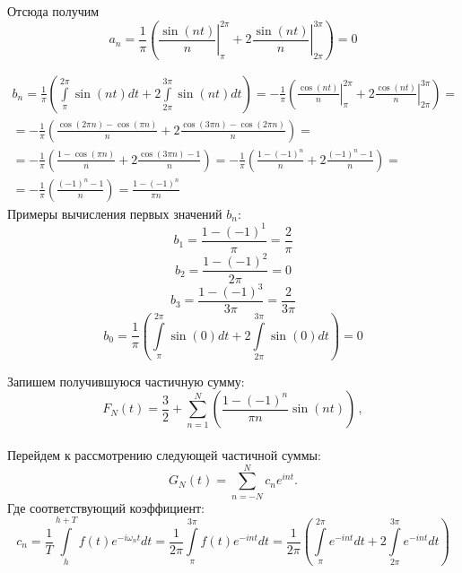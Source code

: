 \documentclass[a5paper, 10pt]{article}
\theoremstyle{definition}
\theoremstyle{plain}
\theoremstyle{remark}
\begin{document}
Отсюда получим
\begin{equation}
a_n = \frac{1}{\pi} \left( \left. \frac{\sin (nt)}{n} \right|_{\pi}^{2\pi} +  2  \left. \frac{\sin (nt)}{n} \right|_{2\pi}^{3\pi} \right) = 0
\end{equation}



\begin{multline}
b_n = \frac{1}{\pi} \left( \int \limits_{\pi}^{2\pi} \sin (n t) dt +  2\int \limits_{2\pi}^{3\pi} \sin (n t) dt \right) =
-\frac{1}{\pi} \left( \left. \frac{\cos (nt)}{n} \right|_{\pi}^{2\pi} +  2  \left. \frac{\cos (nt)}{n} \right|_{2\pi}^{3\pi} \right) =\\
= -\frac{1}{\pi} \left( \frac{\cos (2 \pi n) - \cos (\pi n)}{n} +  2 \frac{\cos (3 \pi n) - \cos (2 \pi n)}{n} \right) = \\
= -\frac{1}{\pi} \left( \frac{ 1 - \cos (\pi n)}{n} +  2 \frac{\cos (3 \pi n) - 1}{n} \right) =
-\frac{1}{\pi} \left( \frac{ 1 - (-1)^n}{n} +  2 \frac{(-1)^n - 1}{n} \right) =\\
= -\frac{1}{\pi} \left( \frac{(-1)^n - 1 }{n} \right) = \frac{1 - (-1)^n}{\pi n}
\end{multline}
Примеры вычисления первых значений $b_n$:
\begin{equation}
b_1 = \frac{1 - (-1)^1}{\pi} = \frac{2}{\pi}
\end{equation}
\begin{equation}
b_2 = \frac{1 - (-1)^2}{2\pi} = 0
\end{equation}
\begin{equation}
b_3 = \frac{1 - (-1)^3}{3\pi} = \frac{2}{3\pi}
\end{equation}
\begin{equation}
b_0 = \frac{1}{\pi} \left( \int \limits_{\pi}^{2\pi} \sin (0) dt +  2\int \limits_{2\pi}^{3\pi} \sin (0) dt \right)  = 0
\end{equation}

Запишем получившуюся частичную сумму:
\begin{equation}
F_N(t) = \frac{3}{2} + \sum  \limits_{n=1}^N \left( \frac{1 - (-1)^n}{\pi n} \sin \left( n t \right)  \right) \, ,
\end{equation}
\\
Перейдем к рассмотрению следующей частичной суммы:
\begin{equation}
G_N (t) = \sum  \limits_{n=-N}^N c_n e^{i n t}.
\end{equation}
Где соответствующий коэффициент:
\begin{equation}
c_n = \frac{1}{T} \int \limits_{h}^{h + T} f(t) e^{-i \omega_n t} dt = \frac{1}{2 \pi} \int \limits_{\pi}^{3 \pi} f(t) e^{-i n t} dt =
\frac{1}{2 \pi} \left( \int \limits_{\pi}^{2 \pi} e^{-i n t} dt + 2 \int \limits_{ 2 \pi}^{3 \pi} e^{-i n t} dt \right) 
\end{equation}
\end{document}
